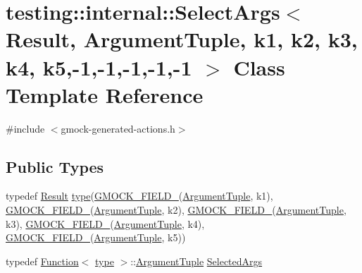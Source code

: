 \hypertarget{classtesting_1_1internal_1_1_select_args_3_01_result_00_01_argument_tuple_00_01k1_00_01k2_00_01k6e7fa8d2e210d646d72ee410b10aa03c}{}\section{testing\+:\+:internal\+:\+:Select\+Args$<$ Result, Argument\+Tuple, k1, k2, k3, k4, k5,-\/1,-\/1,-\/1,-\/1,-\/1 $>$ Class Template Reference}
\label{classtesting_1_1internal_1_1_select_args_3_01_result_00_01_argument_tuple_00_01k1_00_01k2_00_01k6e7fa8d2e210d646d72ee410b10aa03c}


{\ttfamily \#include $<$gmock-\/generated-\/actions.\+h$>$}

\subsection*{Public Types}
\begin{DoxyCompactItemize}
\item 
typedef \hyperlink{typedefs__d_8js_a28287671eaf7406afd604bd055ba4066}{Result} \hyperlink{classtesting_1_1internal_1_1_select_args_3_01_result_00_01_argument_tuple_00_01k1_00_01k2_00_01k6e7fa8d2e210d646d72ee410b10aa03c_aadb1557e45bff523a2d0abe5a539a58d}{type}(\hyperlink{gmock-generated-actions_8h_a6eb3ce92b0613603057a20ec9e593317}{G\+M\+O\+C\+K\+\_\+\+F\+I\+E\+L\+D\+\_\+}(\hyperlink{typedefs__d_8js_a396b2bdc7ef45f482a7e9254b15c3c01}{Argument\+Tuple}, k1), \hyperlink{gmock-generated-actions_8h_a6eb3ce92b0613603057a20ec9e593317}{G\+M\+O\+C\+K\+\_\+\+F\+I\+E\+L\+D\+\_\+}(\hyperlink{typedefs__d_8js_a396b2bdc7ef45f482a7e9254b15c3c01}{Argument\+Tuple}, k2), \hyperlink{gmock-generated-actions_8h_a6eb3ce92b0613603057a20ec9e593317}{G\+M\+O\+C\+K\+\_\+\+F\+I\+E\+L\+D\+\_\+}(\hyperlink{typedefs__d_8js_a396b2bdc7ef45f482a7e9254b15c3c01}{Argument\+Tuple}, k3), \hyperlink{gmock-generated-actions_8h_a6eb3ce92b0613603057a20ec9e593317}{G\+M\+O\+C\+K\+\_\+\+F\+I\+E\+L\+D\+\_\+}(\hyperlink{typedefs__d_8js_a396b2bdc7ef45f482a7e9254b15c3c01}{Argument\+Tuple}, k4), \hyperlink{gmock-generated-actions_8h_a6eb3ce92b0613603057a20ec9e593317}{G\+M\+O\+C\+K\+\_\+\+F\+I\+E\+L\+D\+\_\+}(\hyperlink{typedefs__d_8js_a396b2bdc7ef45f482a7e9254b15c3c01}{Argument\+Tuple}, k5))
\item 
typedef \hyperlink{structtesting_1_1internal_1_1_function}{Function}$<$ \hyperlink{classtesting_1_1internal_1_1_select_args_3_01_result_00_01_argument_tuple_00_01k1_00_01k2_00_01k6e7fa8d2e210d646d72ee410b10aa03c_aadb1557e45bff523a2d0abe5a539a58d}{type} $>$\+::\hyperlink{typedefs__d_8js_a396b2bdc7ef45f482a7e9254b15c3c01}{Argument\+Tuple} \hyperlink{classtesting_1_1internal_1_1_select_args_3_01_result_00_01_argument_tuple_00_01k1_00_01k2_00_01k6e7fa8d2e210d646d72ee410b10aa03c_a96d3b235ab6a72004f4fe2492a3ddd66}{Selected\+Args}
\end{DoxyCompactItemize}
